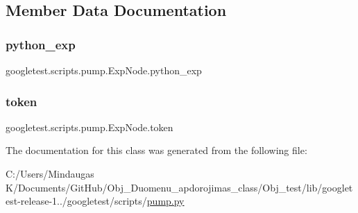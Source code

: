 \subsection{Member Data Documentation}
\mbox{\label{classgoogletest_1_1scripts_1_1pump_1_1_exp_node_a04168a59b1d7ce522ef8b8b12e4b08bf}} 
\subsubsection{\texorpdfstring{python\_exp}{python\_exp}}
{\footnotesize\ttfamily googletest.\+scripts.\+pump.\+Exp\+Node.\+python\+\_\+exp}

\mbox{\label{classgoogletest_1_1scripts_1_1pump_1_1_exp_node_af616e326c39e42a2c10aeb32eb651f60}} 
\subsubsection{\texorpdfstring{token}{token}}
{\footnotesize\ttfamily googletest.\+scripts.\+pump.\+Exp\+Node.\+token}



The documentation for this class was generated from the following file\+:\begin{DoxyCompactItemize}
\item 
C\+:/\+Users/\+Mindaugas K/\+Documents/\+Git\+Hub/\+Obj\+\_\+\+Duomenu\+\_\+apdorojimas\+\_\+class/\+Obj\+\_\+test/lib/googletest-\/release-\/1../googletest/scripts/\mbox{\hyperlink{_obj__test_2lib_2googletest-release-1_88_81_2googletest_2scripts_2pump_8py}{pump.\+py}}\end{DoxyCompactItemize}

